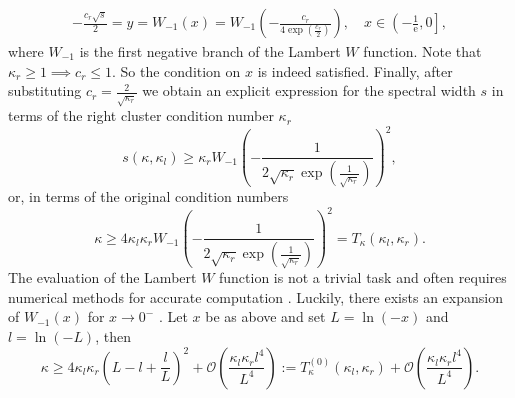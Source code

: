 \begin{align*}
    -\frac{c_r\sqrt{s}}{2} = y = W_{-1}(x) = W_{-1}\left(-\frac{c_r}{4\exp\left(\frac{c_r}{2}\right)}\right), \quad x \in \left(-\frac{1}{\mathrm{e}}, 0 \right],
\end{align*}
where $W_{-1}$ is the first negative branch of the Lambert $W$ function. Note that $\kappa_r\geq1 \implies c_r \leq 1$. So the condition on $x$ is indeed satisfied. Finally, after substituting $c_r = \frac{2}{\sqrt{\kappa_r}}$ we obtain an explicit expression for the spectral width $s$ in terms of the right cluster condition number $\kappa_r$
\[
    s(\kappa, \kappa_l) \geq \kappa_r W_{-1}\left(-\frac{1}{2\sqrt{\kappa_r}\exp\left(\frac{1}{\sqrt{\kappa_r}}\right)}\right)^2,
\]
or, in terms of the original condition numbers
\begin{equation}
    \kappa \geq 4\kappa_l\kappa_r W_{-1}\left(-\frac{1}{2\sqrt{\kappa_r}\exp\left(\frac{1}{\sqrt{\kappa_r}}\right)}\right)^2 = T_{\kappa}(\kappa_l, \kappa_r).
    \label{eq:threshold_inequality_explicit}
\end{equation}
The evaluation of the Lambert $W$ function is not a trivial task and often requires numerical methods for accurate computation \cite{evaluation_of_the_lambert_w_function_Corless1996}. Luckily, there exists an expansion of $W_{-1}(x)$ for $x\rightarrow0^-$ \cite[Equation 4.19]{evaluation_of_the_lambert_w_function_Corless1996}. Let $x$ be as above and set $L = \ln(-x)$ and $l = \ln(-L)$, then
\begin{equation}
    \kappa \geq 4\kappa_l\kappa_r \left(L - l + \frac{l}{L}\right)^2 + \mathcal{O}\left(\frac{\kappa_l\kappa_rl^4}{L^4}\right) := T^{(0)}_{\kappa}(\kappa_l, \kappa_r) + \mathcal{O}\left(\frac{\kappa_l\kappa_rl^4}{L^4}\right).
    \label{eq:threshold_inequality_explicit_expansion}
\end{equation}

